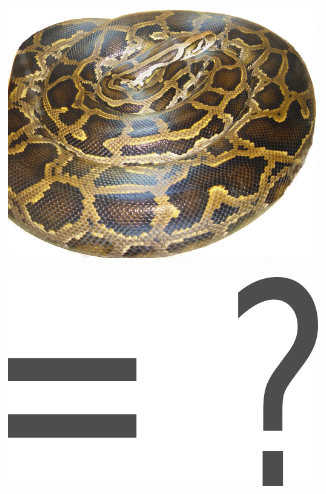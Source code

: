 \documentclass[utf8]{beamer}
\begin{document}
\begin{frame}
\begin{figure}
\begin{subfigure}[b]{0.25\textwidth}
				\includegraphics[width=0.9\textwidth]{img/Python_molurus.png}
			\end{subfigure}%
			\begin{subfigure}[b]{0.25\textwidth}
				\includegraphics[width=0.9\textwidth]{img/text3861.png}
			\end{subfigure}
		\end{figure}
	\end{frame}
\end{document}
